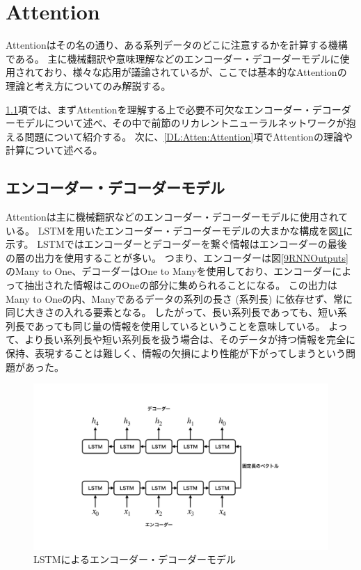 \section{Attention} \label{DL:Attention}

Attention\cite{BahdanauAttention, LuongAttention}はその名の通り、ある系列データのどこに注意するかを計算する機構である。
主に機械翻訳や意味理解などのエンコーダー・デコーダーモデルに使用されており、様々な応用が議論されているが、ここでは基本的なAttentionの理論と考え方についてのみ解説する。

\ref{DL:Atten:EncoderDecoderModel}項では、まずAttentionを理解する上で必要不可欠なエンコーダー・デコーダーモデルについて述べ、その中で前節のリカレントニューラルネットワークが抱える問題について紹介する。
次に、\ref{DL:Atten:Attention}項でAttentionの理論や計算について述べる。


\subsection{エンコーダー・デコーダーモデル} \label{DL:Atten:EncoderDecoderModel}

Attentionは主に機械翻訳などのエンコーダー・デコーダーモデルに使用されている。
LSTMを用いたエンコーダー・デコーダーモデルの大まかな構成を図\ref{18EncoderDecoderLSTM}に示す。
LSTMではエンコーダーとデコーダーを繋ぐ情報はエンコーダーの最後の層の出力を使用することが多い。
つまり、エンコーダーは図\ref{9RNNOutputs}のMany to One、デコーダーはOne to Manyを使用しており、エンコーダーによって抽出された情報はこのOneの部分に集められることになる。
この出力はMany to Oneの内、Manyであるデータの系列の長さ (系列長) に依存せず、常に同じ大きさの入れる要素となる。
したがって、長い系列長であっても、短い系列長であっても同じ量の情報を使用しているということを意味している。
よって、より長い系列長や短い系列長を扱う場合は、そのデータが持つ情報を完全に保持、表現することは難しく、情報の欠損により性能が下がってしまうという問題があった。

\begin{figure}[h]
 \centering
 \includegraphics[trim = 100 100 100 100, width=1.0\textwidth, clip]{Figure/2DeepLearning/18EncoderDecoderLSTM.png}
 \caption{LSTMによるエンコーダー・デコーダーモデル}
 \label{18EncoderDecoderLSTM}
\end{figure}

